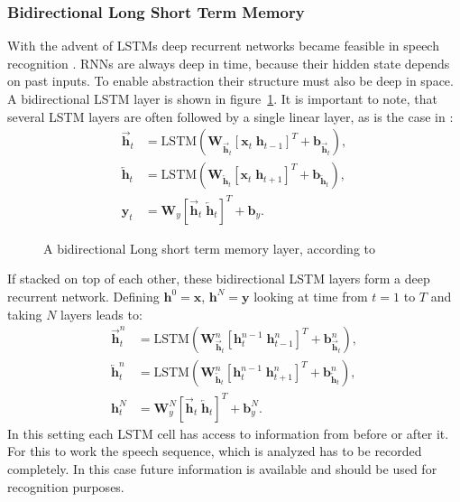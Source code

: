 \subsubsection{Bidirectional Long Short Term Memory}
With the advent of LSTMs deep recurrent networks became feasible in speech recognition \cite{Graves2013b}. RNNs are always deep in time, because their hidden state depends on past inputs. To enable abstraction their structure must also be deep in space. A bidirectional LSTM layer is shown in figure~\ref{fig:blstm}. It is important to note, that several LSTM layers are often followed by a single linear layer, as is the case in \cite{Graves2013b}:
\begin{align}
\overrightarrow{\mathbf{h}}_t &= \text{LSTM}(\mathbf{W}_{\overrightarrow{\mathbf{h}}_t} [\mathbf{x}_t \; \mathbf{h}_{t-1}]^T + \mathbf{b}_{\overrightarrow{\mathbf{h}}_t}),
\\
\overleftarrow{\mathbf{h}}_t &= \text{LSTM}(\mathbf{W}_{\overleftarrow{\mathbf{h}}_t} [\mathbf{x}_t \; \mathbf{h}_{t+1}]^T + \mathbf{b}_{\overleftarrow{\mathbf{h}}_t}),
\\
\mathbf{y}_t &= \mathbf{W}_{y} [\overrightarrow{\mathbf{h}}_t \; \overleftarrow{\mathbf{h}}_t]^T + \mathbf{b}_y.
\end{align}
\begin{figure}
\centering

\caption{A bidirectional Long short term memory layer, according to \cite{Graves2013b} }
\label{fig:blstm}
\end{figure}
If stacked on top of each other, these bidirectional LSTM layers form a deep recurrent network. Defining $\mathbf{h}^0 = \mathbf{x}$, $\mathbf{h}^N = \mathbf{y}$ looking at time from $t = 1$ to $T$ and taking $N$ layers leads to:
\begin{align}
\overrightarrow{\mathbf{h}}_t^n &= \text{LSTM}(\mathbf{W}_{\overrightarrow{\mathbf{h}}_t}^n [\mathbf{h}_t^{n-1} \; \mathbf{h}_{t-1}^n]^T + \mathbf{b}_{\overrightarrow{\mathbf{h}}_t}^n),
\\
\overleftarrow{\mathbf{h}}_t^n &= \text{LSTM}(\mathbf{W}_{\overleftarrow{\mathbf{h}}_t}^n [\mathbf{h}_t^{n-1} \; \mathbf{h}_{t+1}^n]^T + \mathbf{b}_{\overleftarrow{\mathbf{h}}_t}^n),
\\
\mathbf{h}_t^N &= \mathbf{W}_{y}^N [\overrightarrow{\mathbf{h}}_t \; \overleftarrow{\mathbf{h}}_t]^T + \mathbf{b}_y^N.
\end{align}
In this setting each LSTM cell has access to information from before or after it. For this to work the speech sequence, which is analyzed has to be recorded completely. In this case future information is available and should be used for recognition purposes.

